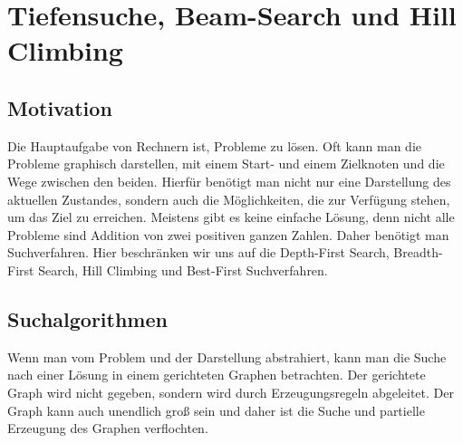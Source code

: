 
\chapter{Tiefensuche, Beam-Search und Hill Climbing}


\algnewcommand{}
\algnewcommand\INPUT{\item[\algorithmicinput]}

\lstset{language=Haskell,frame=single,basicstyle=\small\ttfamily,numbers=left,firstnumber=1}
\lstset{language=Prolog,frame=single,basicstyle=\small\ttfamily,numbers=left,firstnumber=1}

\section{Motivation}

Die Hauptaufgabe von Rechnern ist, Probleme zu lösen. Oft kann man die Probleme graphisch darstellen, mit einem Start- und einem Zielknoten und die Wege zwischen den beiden. Hierfür benötigt man nicht nur eine Darstellung des aktuellen Zustandes, sondern auch die Möglichkeiten, die zur Verfügung stehen, um das Ziel zu erreichen. Meistens gibt es keine einfache Lösung, denn nicht alle Probleme sind Addition von zwei positiven ganzen Zahlen. Daher benötigt man Suchverfahren. Hier beschränken wir uns auf die Depth-First Search, Breadth-First Search, Hill Climbing und Best-First Suchverfahren.

\section{Suchalgorithmen}

Wenn man vom Problem und der Darstellung abstrahiert, kann man die Suche nach einer Lösung in einem gerichteten Graphen betrachten. Der gerichtete Graph wird nicht gegeben, sondern wird durch Erzeugungsregeln abgeleitet. Der Graph kann auch unendlich groß sein und daher ist die Suche und partielle Erzeugung des Graphen verflochten.

